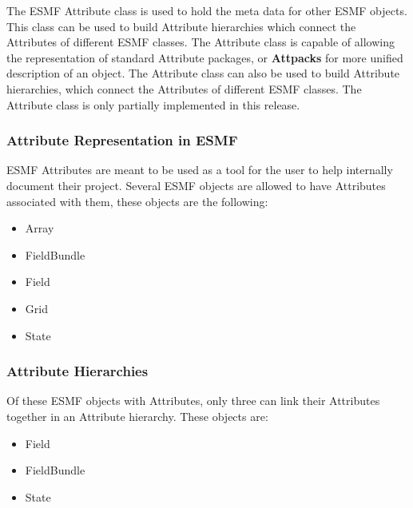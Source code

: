 %

The ESMF Attribute class is used to hold the meta data for other ESMF objects.  This class can be used to build Attribute hierarchies which connect the Attributes of different ESMF classes.  The Attribute class is capable of allowing the representation of standard Attribute packages, or {\bf Attpacks} for more unified description of an object.  The Attribute class can also be used to build Attribute hierarchies, which connect the Attributes of different ESMF classes.  The Attribute class is only partially implemented in this release.

\subsubsection{Attribute Representation in ESMF}

ESMF Attributes are meant to be used as a tool for the user to help internally document their project.   Several ESMF objects are allowed to have Attributes associated with them, these objects are the following:

\begin{itemize}
\item Array
\item FieldBundle
\item Field
\item Grid
\item State
\end{itemize}

\subsubsection{Attribute Hierarchies}

Of these ESMF objects with Attributes, only three can link their Attributes together in an Attribute hierarchy.  These objects are:

\begin{itemize}
\item Field
\item FieldBundle
\item State
\end{itemize}

